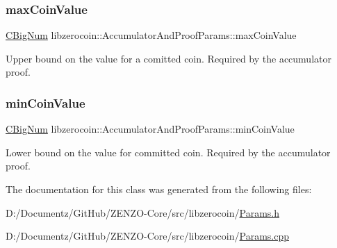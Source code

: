 \subsubsection{\texorpdfstring{maxCoinValue}{maxCoinValue}}
{\footnotesize\ttfamily \mbox{\hyperlink{class_c_big_num}{C\+Big\+Num}} libzerocoin\+::\+Accumulator\+And\+Proof\+Params\+::max\+Coin\+Value}

Upper bound on the value for a comitted coin. Required by the accumulator proof. \mbox{\label{classlibzerocoin_1_1_accumulator_and_proof_params_ae458a09f2a99d4c2643d037196607df1}} 
\subsubsection{\texorpdfstring{minCoinValue}{minCoinValue}}
{\footnotesize\ttfamily \mbox{\hyperlink{class_c_big_num}{C\+Big\+Num}} libzerocoin\+::\+Accumulator\+And\+Proof\+Params\+::min\+Coin\+Value}

Lower bound on the value for committed coin. Required by the accumulator proof. 

The documentation for this class was generated from the following files\+:\begin{DoxyCompactItemize}
\item 
D\+:/\+Documentz/\+Git\+Hub/\+Z\+E\+N\+Z\+O-\/\+Core/src/libzerocoin/\mbox{\hyperlink{_params_8h}{Params.\+h}}\item 
D\+:/\+Documentz/\+Git\+Hub/\+Z\+E\+N\+Z\+O-\/\+Core/src/libzerocoin/\mbox{\hyperlink{_params_8cpp}{Params.\+cpp}}\end{DoxyCompactItemize}
